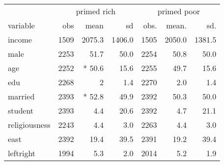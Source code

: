 \captionsetup[table]{labelformat=empty,skip=1pt}
\begin{longtable}{lrrrrrr}
\toprule
 & \multicolumn{3}{c}{primed rich} & \multicolumn{3}{c}{primed poor} \\ 
 \cmidrule(lr){2-4} \cmidrule(lr){5-7}
variable & obs & mean & sd & obs. & mean. & sd. \\ 
\midrule
income & 1509 &  2075.3 & 1406.0 & 1505 & 2050.0 & 1381.5 \\ 
male & 2253 &  51.7 & 50.0 & 2254 & 50.8 & 50.0 \\ 
age & 2252 &  * 50.6 & 15.6 & 2255 & 49.7 & 15.6 \\ 
edu & 2268 &  2 & 1.4 & 2270 & 2.0 & 1.4 \\ 
married & 2393 &  * 52.8 & 49.9 & 2392 & 50.3 & 50.0 \\ 
student & 2393 &  4.4 & 20.6 & 2392 & 4.7 & 21.1 \\ 
religiousness & 2243 &  4.4 & 3.0 & 2263 & 4.4 & 3.0 \\ 
east & 2392 &  19.4 & 39.5 & 2391 & 19.2 & 39.4 \\ 
leftright & 1994 &  5.3 & 2.0 & 2014 & 5.2 & 1.9 \\ 
 \bottomrule
\end{longtable}

